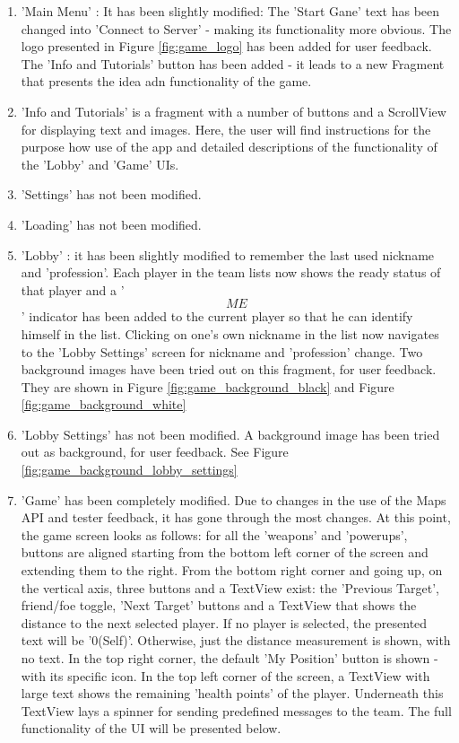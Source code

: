 \documentclass{article}
\begin{document}
\begin{enumerate}
  \item 'Main Menu' : It has been slightly modified: The 'Start Gane' text has
  been changed into 'Connect to Server' - making its functionality more
  obvious. The logo presented in Figure \ref{fig:game_logo} has been added for
  user feedback. The 'Info and Tutorials' button has been added - it leads to
  a new Fragment that presents the idea adn functionality of the game.
  
  \item 'Info and Tutorials' is a fragment with a number of buttons and a
  ScrollView for displaying text and images. Here, the user will find
  instructions for the purpose how use of the app and detailed descriptions of
  the functionality of the 'Lobby' and 'Game' UIs.
  
  \item 'Settings' has not been modified.
  
  \item 'Loading' has not been modified.
  
  \item 'Lobby' : it has been slightly modified to remember the last used
  nickname and 'profession'. Each player in the team lists now shows the ready
  status of that player and a '\[ME\]' indicator has been added to the current
  player so that he can identify himself in the list. Clicking on one's own
  nickname in the list now navigates to the 'Lobby Settings' screen for
  nickname and 'profession' change. Two background images have been tried out on
  this fragment, for user feedback. They are shown in Figure
  \ref{fig:game_background_black} and Figure \ref{fig:game_background_white} 
  
  \item 'Lobby Settings' has not been modified. A background image has been
  tried out as background, for user feedback. See Figure
  \ref{fig:game_background_lobby_settings}
  
  \item 'Game' has been completely modified. Due to changes in the use of the
  Maps API and tester feedback, it has gone through the most changes. At this
  point, the game screen looks as follows: for all the 'weapons' and 'powerups',
  buttons are aligned starting from the bottom left corner of the screen and
  extending them to the right. From the bottom right corner and going up, on the
  vertical axis, three buttons and a TextView exist: the 'Previous Target',
  friend/foe toggle, 'Next Target' buttons and a TextView that shows the
  distance to the next selected player. If no player is selected, the presented
  text will be '0(Self)'. Otherwise, just the distance measurement is shown,
  with no text. In the top right corner, the default 'My Position' button is
  shown - with its specific icon. In the top left corner of the screen, a
  TextView with large text shows the remaining 'health points' of the player.
  Underneath this TextView lays a spinner for sending predefined messages to the
  team. The full functionality of the UI will be presented below.
  
\end{enumerate}
\end{document}
